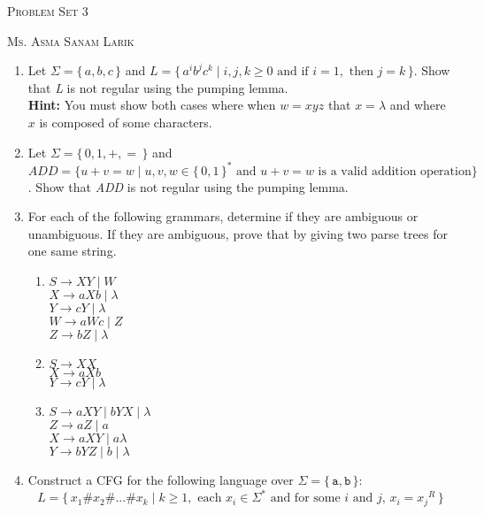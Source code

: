 \documentclass[11pt, article, oneside]{memoir}
\newcommand{\set}[1]{\{\, #1\, \}}
\begin{document}
\begin{center}
\LARGE{\textsc{Problem Set 3}}
 
\large{\textsc{Ms. Asma Sanam Larik}}
\end{center}

\begin{enumerate}
    \item
        Let \(\Sigma = \set{a, b, c}\) and \(L = \set{ {a^i}{b^j}{c^k} \mid i, j, k \ge 0 \text{ and if } i = 1,  \text{ then } j = k}\). Show that \textit{L} is not regular using the pumping lemma.
        \\\textbf{Hint:} You must show both cases where when \(w = xyz\) that \(x = \lambda\) and where \(x\) is composed of some characters.
    \item 
        Let \(\Sigma = \set{0, 1, +, =}\) and \(ADD = \{ u+v=w \mid u, v, w \in \set{0, 1}^* \text{ and } u+v=w \text{ is a valid addition operation}\}\). Show that \textit{ADD} is not regular using the pumping lemma.
    \item
        For each of the following grammars, determine if they are ambiguous or unambiguous. If they are ambiguous, prove that by giving two parse trees for one same string.
        \begin{enumerate}
            \item
                \(S \rightarrow XY \mid W \)
                \\\(X \rightarrow aXb \mid \lambda\)
                \\\(Y \rightarrow cY \mid \lambda\)
                \\\(W \rightarrow aWc \mid Z\)
                \\\(Z \rightarrow bZ \mid \lambda\)
            \item
                \(S \rightarrow XX \)
                \\\(X \rightarrow aXb\)
                \\\(Y \rightarrow cY \mid \lambda\)
            \item
                \(S \rightarrow aXY \mid bYX \mid \lambda \)
                \\\(Z \rightarrow aZ \mid a\)
                \\\(X \rightarrow aXY \mid a \lambda\)
                \\\(Y \rightarrow bYZ \mid b \mid \lambda\) 
        \end{enumerate}
    \item
        Construct a CFG for the following language over \(\Sigma = \set{\texttt{a}, \texttt{b}}\):
        \[
            L = \set{x_1\#x_2\#...\#x_k \mid k \ge 1, \text{ each } x_i \in \Sigma^* \text{ and for some } i \text{ and } j \text{, } x_i = {x_j}^R}
        \]    
\end{enumerate}
\end{document}
